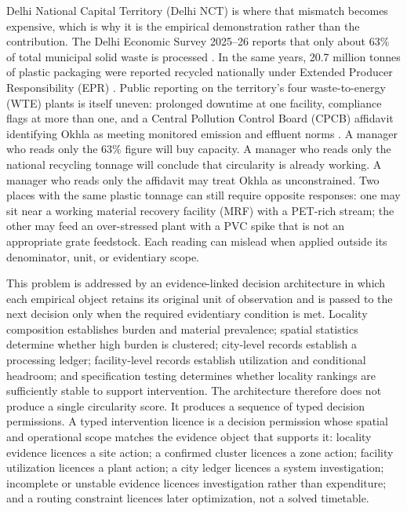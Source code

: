 \documentclass[12pt,a4paper]{article}
\begin{document}
Delhi National Capital Territory (Delhi NCT) is where that mismatch becomes expensive, which is why it is the empirical demonstration rather than the contribution. The Delhi Economic Survey 2025--26 reports that only about 63\% of total municipal solid waste is processed \citep{delhi_eco_survey_2026,ht_delhi_63pct_2026,millennium_post_63pct_2026}. In the same years, 20.7 million tonnes of plastic packaging were reported recycled nationally under Extended Producer Responsibility (EPR) \citep{cpcb_pwm_amendment_2022,cpcb_pwm_amendment_2026,pib_plastic_waste_2025,dte_epr_recycled_2026}. Public reporting on the territory's four waste-to-energy (WTE) plants is itself uneven: prolonged downtime at one facility, compliance flags at more than one, and a Central Pollution Control Board (CPCB) affidavit identifying Okhla as meeting monitored emission and effluent norms \citep{ht_ghazipur_shutdown_2026,ht_cpcb_affidavit_2026}. A manager who reads only the 63\% figure will buy capacity. A manager who reads only the national recycling tonnage will conclude that circularity is already working. A manager who reads only the affidavit may treat Okhla as unconstrained. Two places with the same plastic tonnage can still require opposite responses: one may sit near a working material recovery facility (MRF) with a PET-rich stream; the other may feed an over-stressed plant with a PVC spike that is not an appropriate grate feedstock. Each reading can mislead when applied outside its denominator, unit, or evidentiary scope.

This problem is addressed by an evidence-linked decision architecture in which each empirical object retains its original unit of observation and is passed to the next decision only when the required evidentiary condition is met. Locality composition establishes burden and material prevalence; spatial statistics determine whether high burden is clustered; city-level records establish a processing ledger; facility-level records establish utilization and conditional headroom; and specification testing determines whether locality rankings are sufficiently stable to support intervention. The architecture therefore does not produce a single circularity score. It produces a sequence of typed decision permissions. A typed intervention licence is a decision permission whose spatial and operational scope matches the evidence object that supports it: locality evidence licences a site action; a confirmed cluster licences a zone action; facility utilization licences a plant action; a city ledger licences a system investigation; incomplete or unstable evidence licences investigation rather than expenditure; and a routing constraint licences later optimization, not a solved timetable.
\end{document}
